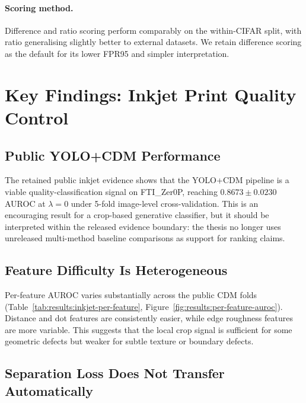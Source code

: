 \paragraph{Scoring method.}
Difference and ratio scoring perform comparably on the within-CIFAR
split, with ratio generalising slightly better to external datasets. We
retain difference scoring as the default for its lower FPR95 and simpler
interpretation.


\section{Key Findings: Inkjet Print Quality Control}
\label{sec:disc:inkjet}

\subsection{Public YOLO+CDM Performance}
\label{sec:disc:inkjet:public-cdm}

The retained public inkjet evidence shows that the YOLO+CDM pipeline is
a viable quality-classification signal on FTI\_Zer0P, reaching
$0.8673 \pm 0.0230$ AUROC at $\lambda = 0$ under 5-fold image-level
cross-validation. This is an encouraging result for a crop-based
generative classifier, but it should be interpreted within the released
evidence boundary: the thesis no longer uses unreleased multi-method
baseline comparisons as support for ranking claims.

\subsection{Feature Difficulty Is Heterogeneous}
\label{sec:disc:inkjet:feature-difficulty}

Per-feature AUROC varies substantially across the public CDM folds
(Table~\ref{tab:results:inkjet-per-feature},
Figure~\ref{fig:results:per-feature-auroc}). Distance and dot features
are consistently easier, while edge roughness features are more variable.
This suggests that the local crop signal is sufficient for some geometric
defects but weaker for subtle texture or boundary defects.

\subsection{Separation Loss Does Not Transfer Automatically}
\label{sec:disc:inkjet:separation}

